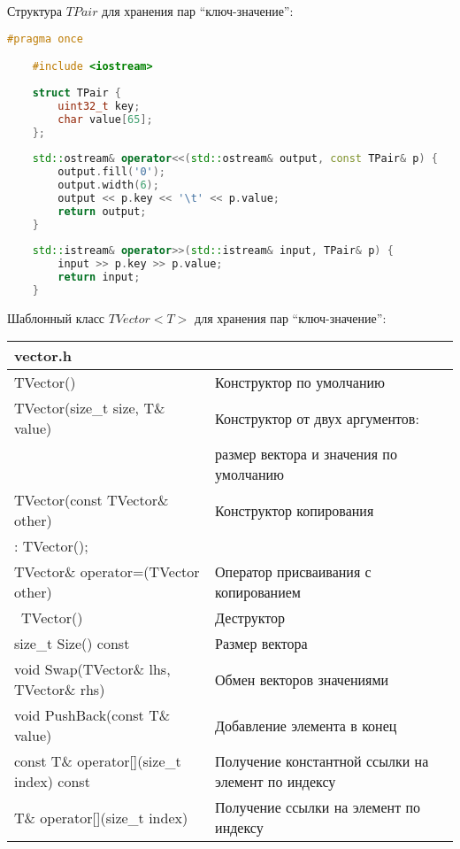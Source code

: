 Структура $TPair$ для хранения пар \enquote{ключ-значение}:
\begin{lstlisting}[language=C++]
    #pragma once

    #include <iostream>
    
    struct TPair {
        uint32_t key;
        char value[65];
    };
    
    std::ostream& operator<<(std::ostream& output, const TPair& p) {
        output.fill('0');
        output.width(6);
        output << p.key << '\t' << p.value;
        return output;
    }
    
    std::istream& operator>>(std::istream& input, TPair& p) {
        input >> p.key >> p.value;
        return input;
    }
\end{lstlisting}

Шаблонный класс $TVector<T>$ для хранения пар \enquote{ключ-значение}:

\begin{longtable}{|p{7.5cm}|p{7.5cm}|}
\hline
\rowcolor{lightgray}
\multicolumn{2}{|c|} {vector.h}\\\hline
TVector()&Конструктор по умолчанию\\\hline
TVector(size\_t size, T\& value)&Конструктор от двух аргументов:\\ 
&размер вектора и значения по умолчанию\\\hline
TVector(const TVector\& other)&Конструктор копирования\\ 
: TVector();&\\\hline
TVector\& operator=(TVector other)&Оператор присваивания с копированием\\\hline
~TVector()&Деструктор\\\hline
size\_t Size() const&Размер вектора\\\hline
void Swap(TVector\& lhs, TVector\& rhs)&Обмен векторов значениями\\\hline
void PushBack(const T\& value)&Добавление элемента в конец\\\hline
const T\& operator[](size\_t index) const&Получение константной ссылки на элемент по индексу\\\hline
T\& operator[](size\_t index)&Получение ссылки на элемент по индексу\\\hline
\end{longtable}

